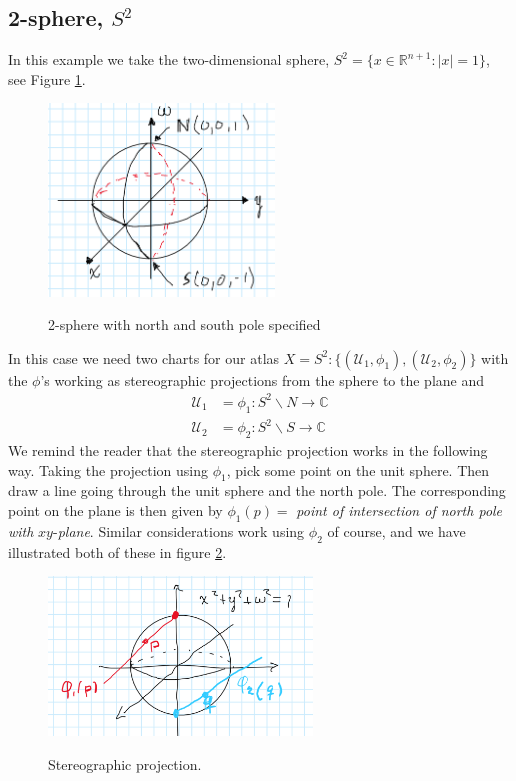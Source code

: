 \documentclass[lettersize,12pt]{article}
\begin{document}
\subsection{2-sphere, $S^2$}
In this example we take the two-dimensional sphere, $S^2=\{x\in \mathds{R}^{n+1}: |x|=1\}$, see Figure \ref{fig:spher}.
\begin{figure}[H] \centering
\includegraphics[width=6cm]{7}  \label{fig:spher} \caption{2-sphere with north and south pole specified}
\end{figure}
In this case we need two charts for our atlas $X=S^2:\{(\mathcal{U}_1,\phi_1),(\mathcal{U}_2,\phi_2)\}$
with the $\phi$'s working as stereographic projections from the sphere to the plane and
\begin{equation}
	\begin{aligned}
		\mathcal{U}_1&=\phi_1: S^2\backslash N\to \mathds{C} \\
		\mathcal{U}_2&=\phi_2: S^2\backslash S\to \mathds{C}
	\end{aligned}
\end{equation}
We remind the reader that the stereographic projection works in the following way. Taking the projection using $\phi_1$, pick some point on the unit sphere. Then draw a line going through the unit sphere and the north pole. The corresponding point on the plane is then given by $\phi_1(p)=$ \textit{point of intersection of north pole with} $xy$-\textit{plane}. Similar considerations work using $\phi_2$ of course, and we have illustrated both of these in figure \ref{fig:stereo}.
\begin{figure}[H]\centering
\includegraphics[width=7cm]{8} \label{fig:stereo} \caption{Stereographic projection.}
\end{figure}
\end{document}
